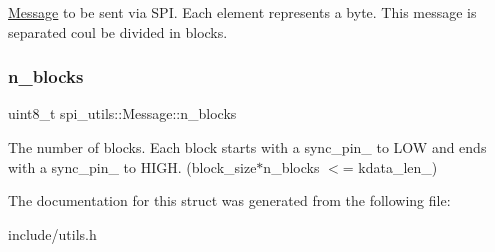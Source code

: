 \mbox{\hyperlink{structspi__utils_1_1Message}{Message}} to be sent via S\+PI. Each element represents a byte. This message is separated coul be divided in blocks. \mbox{\label{structspi__utils_1_1Message_a00d125aa721450f39c7ae0310090af65}} 
\subsubsection{\texorpdfstring{n\+\_\+blocks}{n\_blocks}}
{\footnotesize\ttfamily uint8\+\_\+t spi\+\_\+utils\+::\+Message\+::n\+\_\+blocks}

The number of blocks. Each block starts with a sync\+\_\+pin\+\_\+ to L\+OW and ends with a sync\+\_\+pin\+\_\+ to H\+I\+GH. (block\+\_\+size$\ast$n\+\_\+blocks $<$= kdata\+\_\+len\+\_\+) 

The documentation for this struct was generated from the following file\+:\begin{DoxyCompactItemize}
\item 
include/utils.\+h\end{DoxyCompactItemize}
